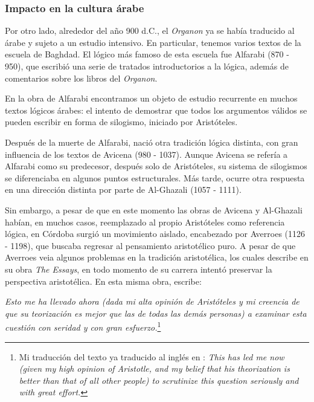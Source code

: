 \documentclass{article}
\begin{document}
\subsubsection{Impacto en la cultura árabe}

Por otro lado, alrededor del año 900 d.C., el \textit{Organon} ya se había traducido al árabe y sujeto a un estudio intensivo. En particular, tenemos varios textos de la escuela de Baghdad. El lógico más famoso de esta escuela fue Alfarabi (870 - 950), que escribió una serie de tratados introductorios a la lógica, además de comentarios sobre los libros del \textit{Organon}.

En la obra de Alfarabi encontramos un objeto de estudio recurrente en muchos textos lógicos árabes: el intento de demostrar que todos los argumentos válidos se pueden escribir en forma de silogismo, iniciado por Aristóteles.

Después de la muerte de Alfarabi, nació otra tradición lógica distinta, con gran influencia de los textos de Avicena (980 - 1037). Aunque Avicena se refería a Alfarabi como su predecesor, después solo de Aristóteles, su sistema de silogismos se diferenciaba en algunos puntos estructurales. Más tarde, ocurre otra respuesta en una dirección distinta por parte de Al-Ghazali (1057 - 1111).

Sin embargo, a pesar de que en este momento las obras de Avicena y Al-Ghazali habían, en muchos casos, reemplazado al propio Aristóteles como referencia lógica, en Córdoba surgió un movimiento aislado, encabezado por Averroes (1126 - 1198), que buscaba regresar al pensamiento aristotélico puro. A pesar de que Averroes veia algunos problemas en la tradición aristotélica, los cuales describe en su obra \textit{The Essays}, en todo momento de su carrera intentó preservar la perspectiva aristotélica\cite{street2001arabic}. En esta misma obra, escribe:

\begin{displayquote}
     \textit{Esto me ha llevado ahora (dada mi alta opinión de Aristóteles y mi creencia de que su teorización es mejor que las de todas las demás personas) a examinar esta cuestión con seridad y con gran esfuerzo.}\footnote{Mi traducción del texto ya traducido al inglés en \cite{street2001arabic}: \textit{This has led me now
    (given my high opinion of Aristotle, and my belief that his theorization is better than that of all other people) to scrutinize this question seriously and
    with great effort.}}
\end{displayquote}
\end{document}
